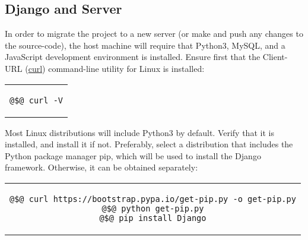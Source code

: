 \documentclass[11pt]{article}
\begin{document}
\subsection{Django and Server}
In order to migrate the project to a new server (or make and push any changes to the source-code),
the host machine will require that Python3, MySQL, and a JavaScript development environment is
installed. Ensure first that the Client-URL (\url{curl}) command-line utility for Linux is
installed:
\begin{center} \begin{tabular}{c} \begin{lstlisting}[linewidth=1.75cm]
@$@ curl -V
\end{lstlisting} \end{tabular} \end{center}
If not, install it using your system's appropriate package-installation tool. For Debian, Ubuntu,
or related distributions, use:
\begin{center} \begin{tabular}{c} \begin{lstlisting}[linewidth=5cm]
@$@ sudo apt-get install curl
\end{lstlisting} \end{tabular} \end{center}
Most Linux distributions will include Python3 by default. Verify that it is installed, and install
it if not. Preferably, select a distribution that includes the Python package manager pip, which
will be used to install the Django framework. Otherwise, it can be obtained separately:
\begin{center} \begin{tabular}{c} \begin{lstlisting}[linewidth=10.8cm]
@$@ curl https://bootstrap.pypa.io/get-pip.py -o get-pip.py
@$@ python get-pip.py
@$@ pip install Django
\end{lstlisting} \end{tabular} \end{center}
To configure the project's database, ensure that SQLite (\url{v.3.30.1} or later) is installed on the
host-machine. The system's tables are structured as follows:
\begin{figure}[H]
\texttt{[image: tables.png]}
\centering
\end{figure}
\pagebreak
\noindent To run the server on the new host-machine, begin by ensuring that all required dependencies are
first installed:
\begin{center} \begin{tabular}{c} \begin{lstlisting}[linewidth=6cm]
@$@ pip3 install -r requirements.txt
@$@ pip3 install django-allauth
@$@ pip3 install channels
@$@ pip3 install django-rest-auth
@$@ pip3 install channels_redis
@$@ pip3 install "whitenoise <4"
@$@ pip3 install service_identity
\end{lstlisting} \end{tabular} \end{center}
\end{document}
